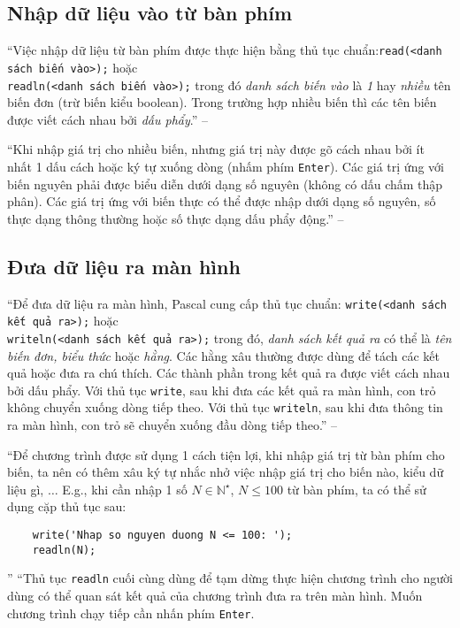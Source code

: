 \documentclass[oneside]{book}
\numberwithin{equation}{section}
\begin{document}
\subsection{Nhập dữ liệu vào từ bàn phím}
``Việc nhập dữ liệu từ bàn phím được thực hiện bằng thủ tục chuẩn:\verb|read(<danh sách biến vào>);| hoặc\\\verb|readln(<danh sách biến vào>);| trong đó \textit{danh sách biến vào} là \textit{1} hay \textit{nhiều} tên biến đơn (trừ biến kiểu boolean). Trong trường hợp nhiều biến thì các tên biến được viết cách nhau bởi \textit{dấu phẩy}.'' -- \cite[p. 29]{SGK_Tin_Hoc_11}

``Khi nhập giá trị cho nhiều biến, nhưng giá trị này được gõ cách nhau bởi ít nhất 1 dấu cách hoặc ký tự xuống dòng (nhấm phím \texttt{Enter}). Các giá trị ứng với biến nguyên phải được biểu diễn dưới dạng số nguyên (không có dấu chấm thập phân). Các giá trị ứng với biến thực có thể được nhập dưới dạng số nguyên, số thực dạng thông thường hoặc số thực dạng dấu phẩy động.'' -- \cite[p. 30]{SGK_Tin_Hoc_11}

\subsection{Đưa dữ liệu ra màn hình}
``Để đưa dữ liệu ra màn hình, Pascal cung cấp thủ tục chuẩn: \verb|write(<danh sách kết quả ra>);| hoặc\\\verb|writeln(<danh sách kết quả ra>);| trong đó, \textit{danh sách kết quả ra} có thể là \textit{tên biến đơn, biểu thức} hoặc \textit{hằng}. Các hằng xâu thường được dùng để tách các kết quả hoặc đưa ra chú thích. Các thành phần trong kết quả ra được viết cách nhau bởi dấu phẩy. Với thủ tục \texttt{write}, sau khi đưa các kết quả ra màn hình, con trỏ không chuyển xuống dòng tiếp theo. Với thủ tục \texttt{writeln}, sau khi đưa thông tin ra màn hình, con trỏ sẽ chuyển xuống đầu dòng tiếp theo.'' -- \cite[p. 30]{SGK_Tin_Hoc_11}

``Để chương trình được sử dụng 1 cách tiện lợi, khi nhập giá trị từ bàn phím cho biến, ta nên có thêm xâu ký tự nhắc nhở việc nhập giá trị cho biến nào, kiểu dữ liệu gì, $\ldots$ E.g., khi cần nhập 1 số $N\in\mathbb{N}^\star$, $N\le 100$ từ bàn phím, ta có thể sử dụng cặp thủ tục sau:
\begin{verbatim}
	write('Nhap so nguyen duong N <= 100: ');
	readln(N);
\end{verbatim}
'' ``Thủ tục \texttt{readln} cuối cùng dùng để tạm dừng thực hiện chương trình cho người dùng có thể quan sát kết quả của chương trình đưa ra trên màn hình. Muốn chương trình chạy tiếp cần nhấn phím \texttt{Enter}.
\end{document}
